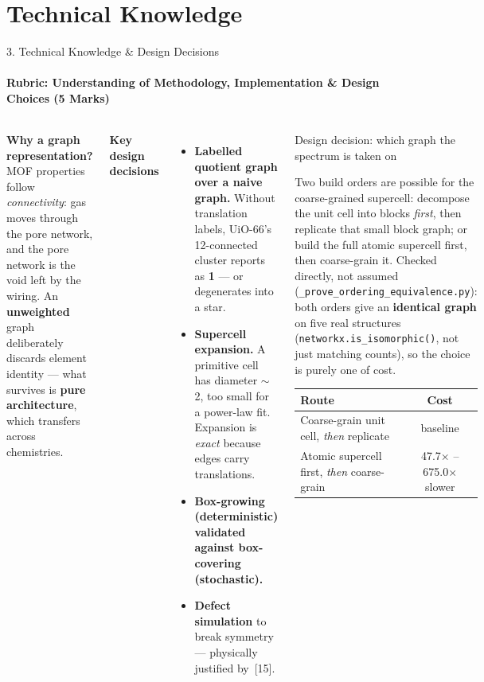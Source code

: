 \documentclass[aspectratio=169, 11pt]{beamer}
\begin{document}
\section{Technical Knowledge}
\begin{frame}{3. Technical Knowledge \& Design Decisions}
\framesubtitle{Rubric: Understanding of Methodology, Implementation \& Design Choices (5 Marks)}
\begin{columns}[T]
{\scriptsize
\textbf{Why a graph representation?} MOF properties follow \textit{connectivity}: gas moves
through the pore network, and the pore network is the void left by the wiring. An
\textbf{unweighted} graph deliberately discards element identity --- what survives is
\textbf{pure architecture}, which transfers across chemistries.

\vspace{0.1cm}
\textbf{Key design decisions}
\begin{itemize}\scriptsize
  \item \textbf{Labelled quotient graph over a naive graph.} Without translation labels,
        UiO-66's 12-connected cluster reports as \textbf{1} --- or degenerates into a star.
  \item \textbf{Supercell expansion.} A primitive cell has diameter $\sim$2, too small for
        a power-law fit. Expansion is \textit{exact} because edges carry translations.
  \item \textbf{Box-growing (deterministic) validated against box-covering (stochastic).}
  \item \textbf{Defect simulation} to break symmetry --- physically justified by~[15].
\end{itemize}
}

\begin{block}{\footnotesize Design decision: which graph the spectrum is taken on}
{\scriptsize
Two build orders are possible for the coarse-grained supercell: decompose the unit cell into
blocks \textit{first}, then replicate that small block graph; or build the full atomic
supercell first, then coarse-grain it. Checked directly, not assumed
(\texttt{\_prove\_ordering\_equivalence.py}): both orders give an \textbf{identical graph}
on five real structures (\texttt{networkx.is\_isomorphic()}, not just matching counts), so
the choice is purely one of cost.
\vspace{0.06cm}

\begin{tabular}{@{}lc@{}}
\toprule
Route & Cost \\
\midrule
Coarse-grain unit cell, \textit{then} replicate & baseline \\
Atomic supercell first, \textit{then} coarse-grain & 47.7$\times$ -- 675.0$\times$ slower \\
\bottomrule
\end{tabular}
\vspace{0.06cm}

}
\end{block}
\end{columns}
\end{frame}
\end{document}
